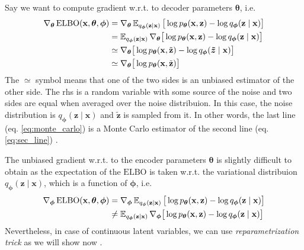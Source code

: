 Say we want to compute gradient w.r.t. to decoder parameters ${\boldsymbol{\theta}}$, i.e. 
\begin{align}
    \nabla_{{\boldsymbol{\theta}}}\,\mathrm{ELBO}(\mathbf{x},{\boldsymbol{\theta}},{\boldsymbol{\phi}}) &= \nabla_{{\boldsymbol{\theta}}} \operatorname{\mathbb{E}}_{q_{\boldsymbol{\phi}}(\mathbf{z}\mid\mathbf{x})} \big[\log p_{\boldsymbol{\theta}}(\mathbf{x},\mathbf{z}) - \log q_{\boldsymbol{\phi}}(\mathbf{z}\mid\mathbf{x})\big] \notag \\
        &= \operatorname{\mathbb{E}}_{q_{\boldsymbol{\phi}}(\mathbf{z}\mid\mathbf{x})} \nabla_{{\boldsymbol{\theta}}} \big[\log p_{\boldsymbol{\theta}}(\mathbf{x},\mathbf{z}) - \log q_{\boldsymbol{\phi}}(\mathbf{z}\mid\mathbf{x})\big] \label{eq:sec_line} \\
        &\simeq  \nabla_{{\boldsymbol{\theta}}} \big[\log p_{\boldsymbol{\theta}}(\mathbf{x},\tilde{\mathbf{z}}) - \log q_{\boldsymbol{\phi}}(\boldsymbol{\tilde{z}}\mid\mathbf{x})\big] \notag\\
        &\simeq \nabla_{{\boldsymbol{\theta}}} \big[\log p_{\boldsymbol{\theta}}(\mathbf{x},\tilde{\mathbf{z}})\big] \label{eq:monte_carlo}
\end{align}
The $\simeq$ symbol means that one of the two sides is an unbiased estimator of the other side. The rhs is a random variable with some source of the noise and two sides are equal
when averaged over the noise distribuion. In this case, the noise distribution is $q_{\boldsymbol{\phi}}(\mathbf{z}\mid \mathbf{x})$ and $\tilde{\mathbf{z}}$ is sampled from it. In other words, the last 
line (eq. \ref{eq:monte_carlo}) is a Monte Carlo estimator of the second line (eq. \ref{eq:sec_line}) \cite{intro-vae-2019}.

The unbiased gradient w.r.t. to the encoder parameters ${\boldsymbol{\theta}}$ is slightly difficult to obtain as the expectation of the $\mathrm{ELBO}$ is taken w.r.t. the variational distribuion 
$q_{\boldsymbol{\phi}}(\mathbf{z}\mid \mathbf{x})$, which is a function of ${\boldsymbol{\phi}}$, i.e.
\begin{align}
    \nabla_{{\boldsymbol{\phi}}}\,\mathrm{ELBO}(\mathbf{x},{\boldsymbol{\theta}},{\boldsymbol{\phi}}) &= \nabla_{{\boldsymbol{\phi}}} \operatorname{\mathbb{E}}_{q_{\boldsymbol{\phi}}(\mathbf{z}\mid \mathbf{x})} \big[\log p_{\boldsymbol{\theta}}(\mathbf{x},\mathbf{z}) - \log q_{\boldsymbol{\phi}}(\mathbf{z}\mid \mathbf{x})\big] \\
                                                         &\neq  \operatorname{\mathbb{E}}_{q_{\boldsymbol{\phi}}(\mathbf{z}\mid \mathbf{x})} \nabla_{{\boldsymbol{\phi}}} \big[\log p_{\boldsymbol{\theta}}(\mathbf{x},\mathbf{z}) - \log q_{\boldsymbol{\phi}}(\mathbf{z}\mid \mathbf{x})\big]
\end{align}
Nevertheless, in case of continuous latent variables, we can use \textit{reparametrization trick} \cite{renedze-backprop-2014} as we will show now \cite{intro-vae-2019}.

